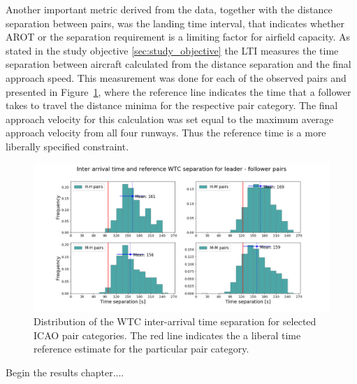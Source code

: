 Another important metric derived from the data, together with the distance separation between pairs, was the landing time interval, that indicates whether AROT or the separation requirement is a limiting factor for airfield capacity. As stated in the study objective \ref{sec:study_objective} the LTI measures the time separation between aircraft calculated from the distance separation and the final approach speed. This measurement was done for each of the observed pairs and presented in Figure~\ref{fig:time_separ_HH_HM_MH_MM_pairs}, where the reference line indicates the time that a follower takes to travel the distance minima for the respective pair category. The final approach velocity for this calculation was set equal to the maximum average approach velocity from all four runways. Thus the reference time is a more liberally specified constraint. 
\begin{figure}[h]
    \centering
    \includegraphics[width=1\textwidth]{graphics/fig_time_separ_HH_HM_MH_MM_pairs.png}
    \caption[Distribution of inter-arrival time separation for ICAO pairs]{Distribution of the WTC inter-arrival time separation for selected ICAO pair categories. The red line indicates the a liberal time reference estimate for the particular pair category.}
    \label{fig:time_separ_HH_HM_MH_MM_pairs}
\end{figure}


Begin the results chapter....

